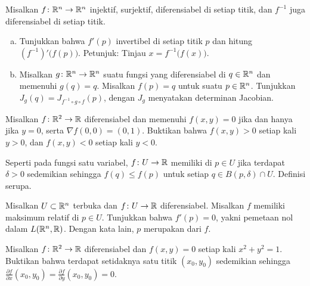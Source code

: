 \begin{samepage}
\begin{exercise}
Misalkan $f \colon {\mathbb{R}}^n \to {\mathbb{R}}^n$ injektif, surjektif, diferensiabel di setiap
titik, dan $f^{-1}$ juga diferensiabel di setiap titik.
\begin{enumerate}[a)]
\item
Tunjukkan bahwa $f'(p)$ invertibel di setiap titik $p$ dan hitung
${(f^{-1})}'\bigl(f(p)\bigr)$.  Petunjuk: Tinjau $x = f^{-1}\bigl(f(x)\bigr)$.
\item
Misalkan $g \colon {\mathbb{R}}^n \to {\mathbb{R}}^n$ suatu fungsi yang diferensiabel di $q \in {\mathbb{R}}^n$
dan memenuhi $g(q)=q$.  Misalkan $f(p) = q$ untuk suatu $p \in {\mathbb{R}}^n$.
Tunjukkan $J_g(q) = J_{f^{-1} \circ g \circ f}(p)$, dengan $J_g$ menyatakan determinan
Jacobian.
\end{enumerate}
\end{exercise}
\end{samepage}

\begin{exercise}
Misalkan $f \colon {\mathbb{R}}^2 \to {\mathbb{R}}$ diferensiabel dan memenuhi
$f(x,y) = 0$ jika dan hanya jika $y=0$, serta $\nabla f(0,0) = (0,1)$.
Buktikan bahwa $f(x,y) > 0$ setiap kali $y > 0$, dan
$f(x,y) < 0$ setiap kali $y < 0$.
\end{exercise}

\begin{exnote}
\pagebreak[2]
Seperti pada fungsi satu variabel, $f \colon U \to {\mathbb{R}}$ memiliki
\emph{} di $p \in U$ jika terdapat
$\delta >0$ sedemikian sehingga $f(q) \leq f(p)$ untuk setiap $q \in B(p,\delta) \cap U$.
Definisi \emph{} serupa.
\end{exnote}

\begin{exercise} \label{exercise:mv:maximumcritical}
Misalkan $U \subset {\mathbb{R}}^n$ terbuka dan
$f \colon U \to {\mathbb{R}}$ diferensiabel.  Misalkan $f$ memiliki maksimum relatif
di $p \in U$.  Tunjukkan bahwa $f'(p) = 0$, yakni pemetaan nol dalam
$L({\mathbb{R}}^n,{\mathbb{R}})$.  Dengan kata lain, $p$ merupakan
\emph{} dari $f$.
\end{exercise}

\begin{exercise}
Misalkan $f \colon {\mathbb{R}}^2 \to {\mathbb{R}}$ diferensiabel dan
$f(x,y) = 0$ setiap kali $x^2+y^2 = 1$.
Buktikan bahwa terdapat setidaknya
satu titik $(x_0,y_0)$ sedemikian sehingga
$\frac{\partial f}{\partial x}(x_0,y_0) = \frac{\partial f}{\partial
y}(x_0,y_0) = 0$.
\end{exercise}

